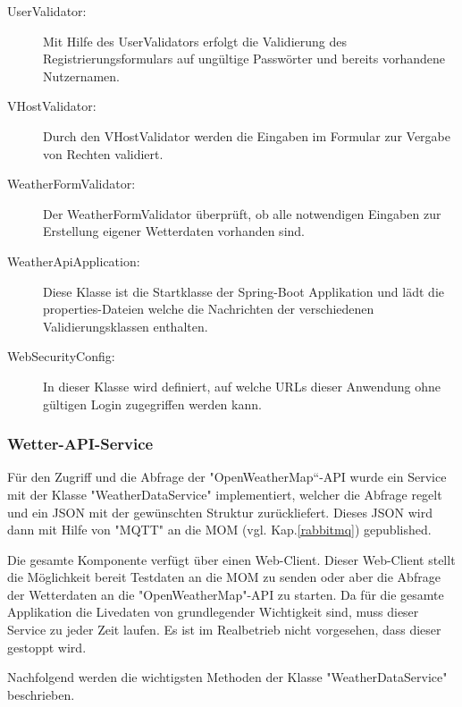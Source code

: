 \begin{description}
\item[UserValidator:]Mit Hilfe des UserValidators erfolgt die Validierung des Registrierungsformulars auf ungültige Passwörter und bereits vorhandene Nutzernamen.
\item[VHostValidator:]Durch den VHostValidator werden die Eingaben im Formular zur Vergabe von Rechten validiert. 
\item[WeatherFormValidator:]Der WeatherFormValidator überprüft, ob alle notwendigen Eingaben zur Erstellung eigener Wetterdaten vorhanden sind.
\item[WeatherApiApplication:]Diese Klasse ist die Startklasse der Spring-Boot Applikation und lädt die properties-Dateien welche die Nachrichten der verschiedenen Validierungsklassen enthalten.
\item[WebSecurityConfig:]In dieser Klasse wird definiert, auf welche URLs dieser Anwendung ohne gültigen Login zugegriffen werden kann.

\end{description}

\subsubsection{Wetter-API-Service}

Für den Zugriff und die Abfrage der "OpenWeatherMap“-API wurde ein Service mit der Klasse "WeatherDataService" implementiert, welcher die Abfrage regelt und ein JSON mit der gewünschten Struktur zurückliefert. Dieses JSON wird dann mit Hilfe von "MQTT" an die MOM (vgl. Kap.\ref{rabbitmq}) gepublished. 

Die gesamte Komponente verfügt über einen Web-Client. Dieser Web-Client stellt die Möglichkeit bereit Testdaten an die MOM zu senden oder aber die Abfrage der Wetterdaten an die "OpenWeatherMap"-API zu starten. Da für die gesamte Applikation die Livedaten von grundlegender Wichtigkeit sind, muss dieser Service zu jeder Zeit laufen. Es ist im Realbetrieb nicht vorgesehen, dass dieser gestoppt wird.

Nachfolgend werden die wichtigsten Methoden der Klasse "WeatherDataService" beschrieben. 

